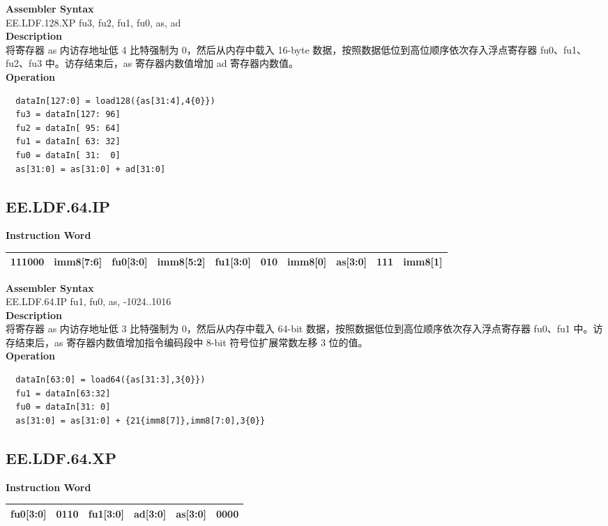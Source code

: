 \textbf{Assembler Syntax} \\
EE.LDF.128.XP fu3, fu2, fu1, fu0, as, ad \\
\textbf{Description} \\
将寄存器 as 内访存地址低 4 比特强制为 0，然后从内存中载入 16-byte 数据，按照数据低位到高位顺序依次存入浮点寄存器 fu0、fu1、fu2、fu3 中。访存结束后，as 寄存器内数值增加 ad 寄存器内数值。\\
\textbf{Operation}
\begin{lstlisting}
  dataIn[127:0] = load128({as[31:4],4{0}})
  fu3 = dataIn[127: 96]
  fu2 = dataIn[ 95: 64]
  fu1 = dataIn[ 63: 32]
  fu0 = dataIn[ 31:  0]
  as[31:0] = as[31:0] + ad[31:0]
\end{lstlisting}

\clearpage
\subsection{EE.LDF.64.IP}\label{instruction:EELDF64IP}
\setlength\tabcolsep{6pt}
\textbf{Instruction Word} \\
\begin{tabular}{|c|c|c|c|c|c|c|c|c|c|}
	\hline
	111000 & imm8[7:6] & fu0[3:0] & imm8[5:2] & fu1[3:0] & 010 & imm8[0] & as[3:0] & 111 & imm8[1] \\
	\hline
\end{tabular}

\textbf{Assembler Syntax} \\
EE.LDF.64.IP fu1, fu0, as, -1024..1016 \\
\textbf{Description} \\
将寄存器 as 内访存地址低 3 比特强制为 0，然后从内存中载入 64-bit 数据，按照数据低位到高位顺序依次存入浮点寄存器 fu0、fu1 中。访存结束后，as 寄存器内数值增加指令编码段中 8-bit 符号位扩展常数左移 3 位的值。\\
\textbf{Operation}
\begin{lstlisting}
  dataIn[63:0] = load64({as[31:3],3{0}})
  fu1 = dataIn[63:32]
  fu0 = dataIn[31: 0]
  as[31:0] = as[31:0] + {21{imm8[7]},imm8[7:0],3{0}}
\end{lstlisting}

\clearpage
\subsection{EE.LDF.64.XP}\label{instruction:EELDF64XP}
\setlength\tabcolsep{6pt}
\textbf{Instruction Word} \\
\begin{tabular}{|c|c|c|c|c|c|}
	\hline
	fu0[3:0] & 0110 & fu1[3:0] & ad[3:0] & as[3:0] & 0000 \\
	\hline
\end{tabular}

